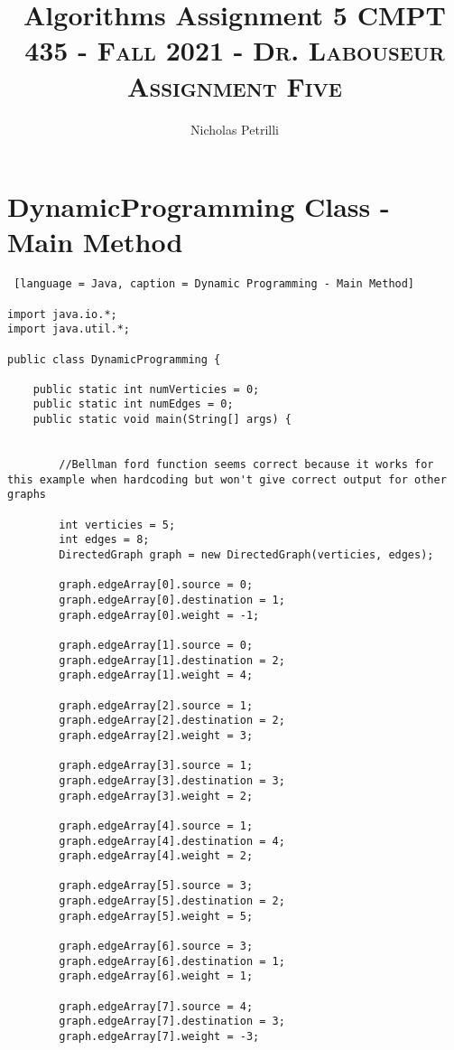 \documentclass{article}
\title{Algorithms Assignment 5}
\author{Nicholas Petrilli}
\title{	
   \normalfont \normalsize 
   \textsc{CMPT 435 - Fall 2021 - Dr. Labouseur} \\[10pt] %
   \textsc{Assignment Five}
}
\begin{document}
\lstset{
  numbers=left,
  firstnumber=1,
  numberfirstline=true
}
\maketitle

\section{DynamicProgramming Class - Main Method}

\begin{lstlisting} [language = Java, caption = Dynamic Programming - Main Method]

import java.io.*;
import java.util.*;

public class DynamicProgramming {

    public static int numVerticies = 0;
    public static int numEdges = 0;
    public static void main(String[] args) {

        
        //Bellman ford function seems correct because it works for this example when hardcoding but won't give correct output for other graphs
        
        int verticies = 5;
        int edges = 8;
        DirectedGraph graph = new DirectedGraph(verticies, edges);

        graph.edgeArray[0].source = 0;
        graph.edgeArray[0].destination = 1;
        graph.edgeArray[0].weight = -1;

        graph.edgeArray[1].source = 0;
        graph.edgeArray[1].destination = 2;
        graph.edgeArray[1].weight = 4;

        graph.edgeArray[2].source = 1;
        graph.edgeArray[2].destination = 2;
        graph.edgeArray[2].weight = 3;

        graph.edgeArray[3].source = 1;
        graph.edgeArray[3].destination = 3;
        graph.edgeArray[3].weight = 2;

        graph.edgeArray[4].source = 1;
        graph.edgeArray[4].destination = 4;
        graph.edgeArray[4].weight = 2;

        graph.edgeArray[5].source = 3;
        graph.edgeArray[5].destination = 2;
        graph.edgeArray[5].weight = 5;

        graph.edgeArray[6].source = 3;
        graph.edgeArray[6].destination = 1;
        graph.edgeArray[6].weight = 1;

        graph.edgeArray[7].source = 4;
        graph.edgeArray[7].destination = 3;
        graph.edgeArray[7].weight = -3;



\end{lstlisting}
\end{document}
